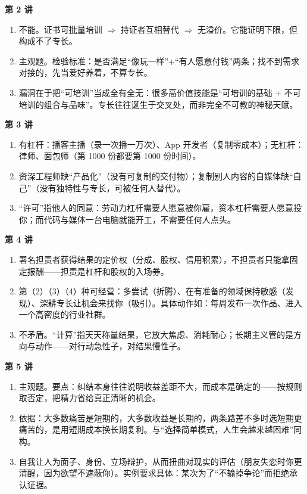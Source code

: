\documentclass[UTF8,a4paper,11pt]{ctexart}
\begin{document}
\textbf{第 2 讲}
\begin{enumerate}
  \item 不能。证书可批量培训 $\Rightarrow$ 持证者互相替代 $\Rightarrow$ 无溢价。它能证明下限，但构成不了专长。
  \item 主观题。检验标准：是否满足“像玩一样”+“有人愿意付钱”两条；找不到需求对接的，先当爱好养着，不算专长。
  \item 漏洞在于把“可培训”当成全有全无：很多高价值技能是“可培训的基础 + 不可培训的组合与品味”。专长往往诞生于交叉处，而非完全不可教的神秘天赋。
\end{enumerate}

\textbf{第 3 讲}
\begin{enumerate}
  \item 有杠杆：播客主播（录一次播一万次）、App 开发者（复制零成本）；无杠杆：律师、面包师（第 1000 份都要第 1000 份时间）。
  \item 资深工程师缺“产品化”（没有可复制的交付物）；复制别人内容的自媒体缺“自己”（没有独特性与专长，可被任何人替代）。
  \item “许可”指他人的同意：劳动力杠杆需要人愿意被你雇，资本杠杆需要人愿意投你；而代码与媒体一台电脑就能开工，不需要任何人点头。
\end{enumerate}

\textbf{第 4 讲}
\begin{enumerate}
  \item 署名担责者获得结果的定价权（分成、股权、信用积累），不担责者只能拿固定报酬——担责是杠杆和股权的入场券。
  \item 第（2）（3）（4）种可经营：多尝试（折腾）、在有准备的领域保持敏感（发现）、深耕专长让机会来找你（吸引）。具体动作如：每周发布一次作品、进入一个高密度的行业社群。
  \item 不矛盾。“计算”指天天称量结果，它放大焦虑、消耗耐心；长期主义管的是方向与动作——对行动急性子，对结果慢性子。
\end{enumerate}

\textbf{第 5 讲}
\begin{enumerate}
  \item 主观题。要点：纠结本身往往说明收益差距不大，而成本是确定的——按规则取否定，把精力省给真正清晰的机会。
  \item 依据：大多数痛苦是短期的，大多数收益是长期的，两条路差不多时选短期更痛苦的，是用短期成本换长期复利。与“选择简单模式，人生会越来越困难”同构。
  \item 自我让人为面子、身份、立场辩护，从而扭曲对现实的评估（朋友失恋时你更清醒，因为欲望不遮蔽你）。实例要求具体：某次为了“不输掉争论”而拒绝承认证据。
\end{enumerate}
\end{document}
